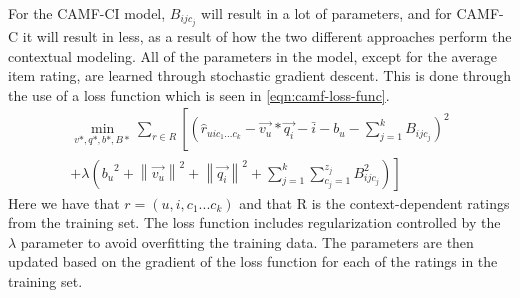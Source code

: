 For the CAMF-CI model, $B_{ijc_j}$ will result in a lot of parameters, and for CAMF-C it will result in less, as a result of how the two different approaches perform the contextual modeling.
All of the parameters in the model, except for the average item rating, are learned through stochastic gradient descent.
This is done through the use of a loss function which is seen in \autoref{eqn:camf-loss-func}.
\begin{equation}
    \label{eqn:camf-loss-func}
    \begin{split}
        \min_{v*, q*, b*, B*}\sum \limits_{r \in  R}\left [ \left (  \hat{r}_{uic_1...c_k} - \vec{v_u} * \vec{q_i} - \bar{i} - b_u - \sum\limits_{j = 1}^k B_{ijc_j}\right )^2 \right. \\
        \left. + \lambda \left({b_u}^2 +{\left \| \vec{v_u} \right \|}^2  + {\left \|\vec{q_i}  \right \|}^2 + \sum\limits_{j = 1}^k \sum\limits_{c_j = 1}^{z_j} B_{ijc_j}^{2}\right ) \right ]
    \end{split}
\end{equation}
Here we have that $r = (u,i,c_1...c_k)$ and that R is the context-dependent ratings from the training set.
The loss function includes regularization controlled by the $\lambda$ parameter to avoid overfitting the training data.
The parameters are then updated based on the gradient of the loss function for each of the ratings in the training set.
